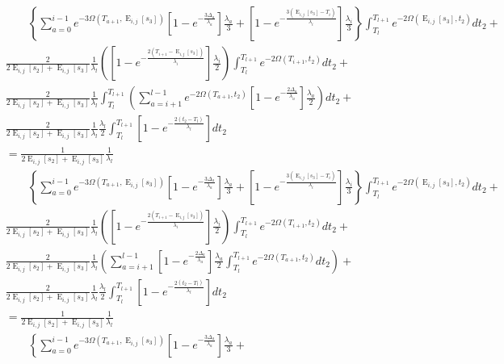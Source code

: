 \documentclass{article}
\DeclareMathOperator{\E}{E}
\begin{document}
\begin{align*}
    &\qquad\left\{\sum_{a=0}^{i-1}e^{-3\Omega(T_{a+1},\E_{i,j}[s_3])}
    \left[1-e^{-\frac{3\Delta_a}{\lambda_a}}\right]\frac{\lambda_a}{3}+
    \left[1-e^{-\frac{3\left(\E_{i,j}[s_3]-T_{i}\right)}{\lambda_{i}}}\right]
    \frac{\lambda_{i}}{3}\right\}\int_{T_l}^{T_{l+1}}e^{-2\Omega(\E_{i,j}[s_3],t_2)}dt_2+\\
    &\frac{2}{2\E_{i,j}[s_2]+\E_{i,j}[s_3]}\frac{1}{\lambda_{l}}
    \left(\left[1-e^{-\frac{2\left(T_{i+1}-\E_{i,j}[s_3]\right)}{\lambda_{i}}}\right]
    \frac{\lambda_{i}}{2}\right)\int_{T_l}^{T_{l+1}}e^{-2\Omega(T_{i+1},t_2)}dt_2+\\
    &\frac{2}{2\E_{i,j}[s_2]+\E_{i,j}[s_3]}\frac{1}{\lambda_{l}}
    \int_{T_l}^{T_{l+1}}\left(\sum_{a=i+1}^{l-1}e^{-2\Omega\left(T_{a+1},t_2\right)}
    \left[1-e^{-\frac{2\Delta_a}{\lambda_a}}\right]\frac{\lambda_a}{2}\right)dt_2+\\
    &\frac{2}{2\E_{i,j}[s_2]+\E_{i,j}[s_3]}\frac{1}{\lambda_{l}}
    \frac{\lambda_{l}}{2}\int_{T_l}^{T_{l+1}}\left[1-e^{-\frac{2\left(t_2-T_{l}\right)}{\lambda_{l}}}\right]dt_2\\
    &=\frac{1}{2\E_{i,j}[s_2]+\E_{i,j}[s_3]}\frac{1}{\lambda_l}\\
    &\qquad\left\{\sum_{a=0}^{i-1}e^{-3\Omega(T_{a+1},\E_{i,j}[s_3])}
    \left[1-e^{-\frac{3\Delta_a}{\lambda_a}}\right]\frac{\lambda_a}{3}+
    \left[1-e^{-\frac{3\left(\E_{i,j}[s_3]-T_{i}\right)}{\lambda_{i}}}\right]
    \frac{\lambda_{i}}{3}\right\}\int_{T_l}^{T_{l+1}}e^{-2\Omega(\E_{i,j}[s_3],t_2)}dt_2+\\
    &\frac{2}{2\E_{i,j}[s_2]+\E_{i,j}[s_3]}\frac{1}{\lambda_{l}}
    \left(\left[1-e^{-\frac{2\left(T_{i+1}-\E_{i,j}[s_3]\right)}{\lambda_{i}}}\right]
    \frac{\lambda_{i}}{2}\right)\int_{T_l}^{T_{l+1}}e^{-2\Omega(T_{i+1},t_2)}dt_2+\\
    &\frac{2}{2\E_{i,j}[s_2]+\E_{i,j}[s_3]}\frac{1}{\lambda_{l}}
    \left(\sum_{a=i+1}^{l-1}\left[1-e^{-\frac{2\Delta_a}{\lambda_a}}\right]\frac{\lambda_a}{2}
    \int_{T_l}^{T_{l+1}}e^{-2\Omega\left(T_{a+1},t_2\right)}dt_2\right)+\\
    &\frac{2}{2\E_{i,j}[s_2]+\E_{i,j}[s_3]}\frac{1}{\lambda_{l}}
    \frac{\lambda_{l}}{2}\int_{T_l}^{T_{l+1}}\left[1-e^{-\frac{2\left(t_2-T_{l}\right)}{\lambda_{l}}}\right]dt_2\\[2em]
    &=\frac{1}{2\E_{i,j}[s_2]+\E_{i,j}[s_3]}\frac{1}{\lambda_l}\\
    &\qquad\left\{\sum_{a=0}^{i-1}e^{-3\Omega(T_{a+1},\E_{i,j}[s_3])}
    \left[1-e^{-\frac{3\Delta_a}{\lambda_a}}\right]\frac{\lambda_a}{3}+

\end{align*}
\end{document}
